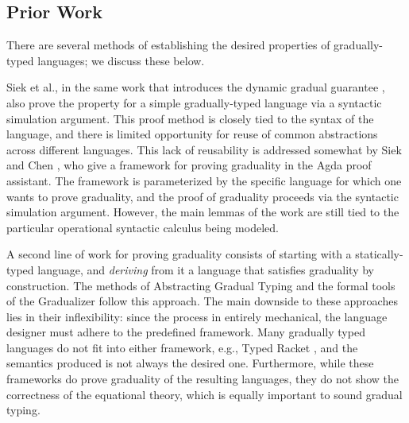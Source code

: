 \documentclass{article}
\theoremstyle{definition}
\theoremstyle{remark}
\begin{document}
\subsection{Prior Work}\label{sec:background-semantics}


There are several methods of establishing the desired properties of
gradually-typed languages; we discuss these below.


Siek et al., in the same work that introduces the dynamic gradual guarantee
\cite{siek_et_al:LIPIcs:2015:5031}, also prove the property for a simple
gradually-typed language via a syntactic simulation argument. This proof method
is closely tied to the syntax of the language, and there is limited opportunity
for reuse of common abstractions across different languages.
%
This lack of reusability is addressed somewhat by Siek and Chen
\cite{siek-chen2021}, who give a framework for proving graduality in the Agda
proof assistant. The framework is parameterized by the specific language for
which one wants to prove graduality, and the proof of graduality proceeds via
the syntactic simulation argument.
%
However, the main lemmas of the work are still tied to the particular
operational syntactic calculus being modeled.


A second line of work for proving graduality consists of starting with a
statically-typed language, and \emph{deriving} from it a language that satisfies
graduality by construction. The methods of Abstracting Gradual Typing
\cite{garcia-clark-tanter2016} and the formal tools of the Gradualizer
\cite{cimini-siek2016} follow this approach. The main downside to these
approaches lies in their inflexibility: since the process in entirely
mechanical, the language designer must adhere to the predefined framework.  Many
gradually typed languages do not fit into either framework, e.g., Typed Racket
\cite{tobin-hochstadt06, tobin-hochstadt08}, and the semantics produced is not
always the desired one.
%
Furthermore, while these frameworks do prove graduality of the resulting
languages, they do not show the correctness of the equational theory, which is
equally important to sound gradual typing.
\end{document}
